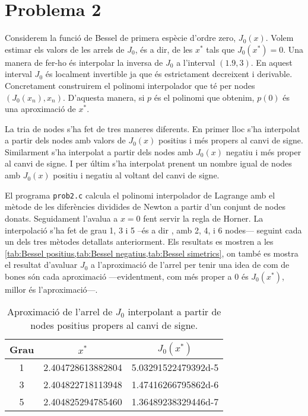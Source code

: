 \documentclass[12pt]{article}
\numberwithin{table}{section}
\numberwithin{figure}{section}
\numberwithin{equation}{section}
\begin{document}
\newpage

\section{Problema 2}
Considerem la funció de Bessel de primera espècie d'ordre zero, $J_0(x)$. Volem estimar els valors de les arrels de \( J_0 \), és a dir, de les \( x^{\ast} \) tals que \( J_0(x^{\ast}) = 0 \). Una manera de fer-ho és interpolar la inversa de \( J_0 \) a l'interval \( (1.9, 3) \). En aquest interval \( J_0 \) és localment invertible ja que és estrictament decreixent i derivable. Concretament construirem el polinomi interpolador que té per nodes \( (J_0(x_n), x_n) \). D'aquesta manera, si \( p \) és el polinomi que obtenim, \( p(0) \) és una aproximació de \( x^{\ast} \).

La tria de nodes s'ha fet de tres maneres diferents. En primer lloc s'ha interpolat a partir dels nodes amb valors de \( J_0(x) \) positius i més propers al canvi de signe. Similarment s'ha interpolat a partir dels nodes amb \( J_0(x) \) negatiu i més proper al canvi de signe. I per últim s'ha interpolat prenent un nombre igual de nodes amb \( J_0(x) \) positiu i negatiu al voltant del canvi de signe.    

El programa \texttt{prob2.c} calcula el polinomi interpolador de Lagrange amb el mètode de les diferències dividides de Newton a partir d'un conjunt de nodes donats. Seguidament l'avalua a \( x=0 \) fent servir la regla de Horner. La interpolació s'ha fet de grau 1, 3 i 5 --és a dir , amb 2, 4, i 6 nodes--- seguint cada un dels tres mètodes detallats anteriorment. Els resultats es mostren a les \cref{tab:Bessel positius,tab:Bessel negatius,tab:Bessel simetrics}, on també es mostra el resultat d'avaluar \( J_0 \) a l'aproximació de l'arrel per tenir una idea de com de bones són cada aproximació ---evidentment, com més proper a 0 és \( J_0(x^{\ast}) \), millor és l'aproximació---. 

\begin{table}[htb]
	\sffamily \small	\centering
	\caption{Aproximació de l'arrel de \( J_0 \) interpolant a partir de nodes positius propers al canvi de signe. }	
	\label{tab:Bessel positius}
	\begin{tabular}{cS[table-parse-only]S[table-parse-only]}
		\toprule
		{Grau} & { \( x^{\ast} \) } & { \( J_0(x^{\ast}) \) } \\
		 & 2.404728613882804 & 5.03291522479392d-5\\
		3 & 2.404822718113948 & 1.47416266795862d-6\\
		5 & 2.404825294785460 & 1.36489238329446d-7\\
		\bottomrule
	\end{tabular}
\end{table}
\end{document}

